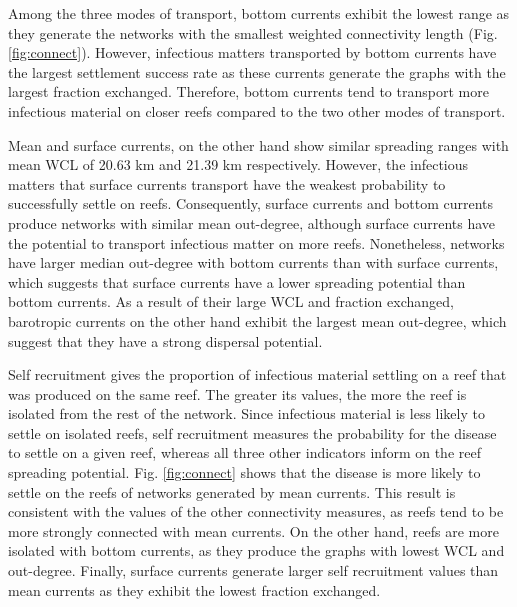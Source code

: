 \documentclass[utf8]{frontiersSCNS}
\begin{document}
Among the three modes of transport, bottom currents exhibit the lowest range as they generate the networks with the smallest weighted connectivity length (Fig. \ref{fig:connect}). However, infectious matters transported by bottom currents have the largest settlement success rate as these currents generate the graphs with the largest fraction exchanged. Therefore, bottom currents tend to transport more infectious material on closer reefs compared to the two other modes of transport.

Mean and surface currents, on the other hand show similar spreading ranges with mean WCL of 20.63 km and 21.39 km respectively. However, the infectious matters that surface currents transport have the weakest probability to successfully settle on reefs. Consequently, surface currents and bottom currents produce networks with similar mean out-degree, although surface currents have the potential to transport infectious matter on more reefs. Nonetheless, networks have larger median out-degree with bottom currents than with surface currents, which suggests that surface currents have a lower spreading potential than bottom currents. As a result of their large WCL and fraction exchanged, barotropic currents on the other hand exhibit the largest mean out-degree, which suggest that they have a strong dispersal potential. 

Self recruitment gives the proportion of infectious material settling on a reef that was produced on the same reef. The greater its values, the more the reef is isolated from the rest of the network. Since infectious material is less likely to settle on isolated reefs, self recruitment measures the probability for the disease to settle on a given reef, whereas all three other indicators inform on the reef spreading potential. Fig. \ref{fig:connect} shows that the disease is more likely to settle on the reefs of networks generated by mean currents. This result is consistent with the values of the other connectivity measures, as reefs tend to be more strongly connected with mean currents. On the other hand, reefs are more isolated with bottom currents, as they produce the graphs with lowest WCL and out-degree. Finally, surface currents generate larger self recruitment values than mean currents as they exhibit the lowest fraction exchanged. 
\end{document}
